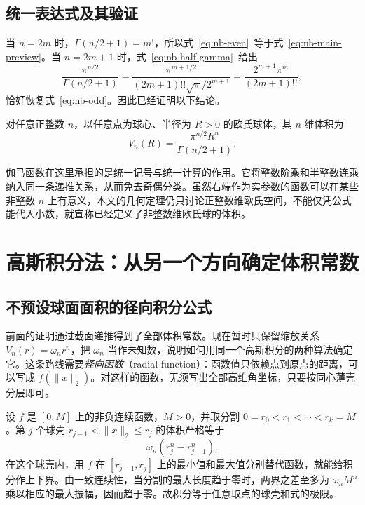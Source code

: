 \documentclass[UTF8,12pt,a4paper,fontset=fandol]{ctexart}
\begin{document}
\subsection{统一表达式及其验证}

当 $n=2m$ 时，$\Gamma(n/2+1)=m!$，所以式~\eqref{eq:nb-even}~等于式~\eqref{eq:nb-main-preview}。当 $n=2m+1$ 时，式~\eqref{eq:nb-half-gamma}~给出
\[
  \frac{\pi^{n/2}}{\Gamma(n/2+1)}
  =\frac{\pi^{m+1/2}}{(2m+1)!!\sqrt\pi/2^{m+1}}
  =\frac{2^{m+1}\pi^m}{(2m+1)!!},
\]
恰好恢复式~\eqref{eq:nb-odd}。因此已经证明以下结论。

\begin{theorem}[$n$ 维欧氏球体的体积]\label{thm:nb-volume}
对任意正整数 $n$，以任意点为球心、半径为 $R>0$ 的欧氏球体，其 $n$ 维体积为
\begin{equation}\label{eq:nb-volume}
  \boxed{V_n(R)=\frac{\pi^{n/2}R^n}{\Gamma(n/2+1)}}.
\end{equation}
\end{theorem}

伽马函数在这里承担的是统一记号与统一计算的作用。它将整数阶乘和半整数连乘纳入同一条递推关系，从而免去奇偶分类。虽然右端作为实参数的函数可以在某些非整数 $n$ 上有意义，本文的几何定理仍只讨论正整数维欧氏空间，不能仅凭公式能代入小数，就宣称已经定义了非整数维欧氏球的体积。

\section{高斯积分法：从另一个方向确定体积常数}
\label{sec:nb-gaussian-method}

\subsection{不预设球面面积的径向积分公式}

前面的证明通过截面递推得到了全部体积常数。现在暂时只保留缩放关系 $V_n(r)=\omega_n r^n$，把 $\omega_n$ 当作未知数，说明如何用同一个高斯积分的两种算法确定它。这条路线需要\emph{径向函数}（radial function）：函数值只依赖点到原点的距离，可以写成 $f(\|x\|_2)$。对这样的函数，无须写出全部高维角坐标，只要按同心薄壳分层即可。

设 $f$ 是 $[0,M]$ 上的非负连续函数，$M>0$，并取分割 $0=r_0<r_1<\cdots<r_k=M$。第 $j$ 个球壳 $r_{j-1}<\|x\|_2\leq r_j$ 的体积严格等于
\[
  \omega_n(r_j^n-r_{j-1}^n).
\]
在这个球壳内，用 $f$ 在 $[r_{j-1},r_j]$ 上的最小值和最大值分别替代函数，就能给积分作上下界。由一致连续性，当分割的最大长度趋于零时，两界之差至多为 $\omega_nM^n$ 乘以相应的最大振幅，因而趋于零。故积分等于任意取点的球壳和式的极限。
\end{document}
